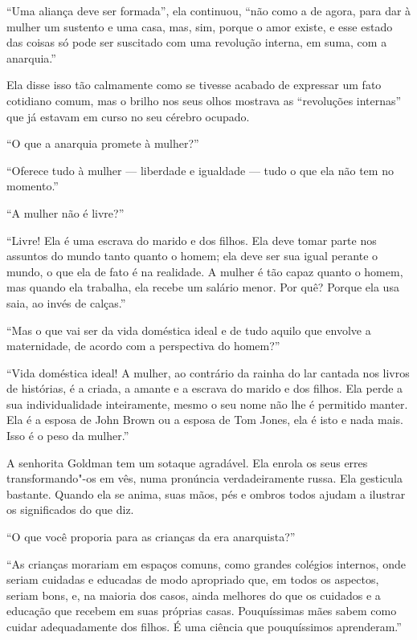 ``Uma aliança deve ser formada'', ela continuou, ``não como a de agora,
para dar à mulher um sustento e uma casa, mas, sim, porque o amor
existe, e esse estado das coisas só pode ser suscitado com uma revolução
interna, em suma, com a anarquia.''\label{alianca}

Ela disse isso tão calmamente como se tivesse acabado de expressar um
fato cotidiano comum, mas o brilho nos seus olhos mostrava as
``revoluções internas'' que já estavam em curso no seu cérebro ocupado.

``O que a anarquia promete à mulher?''

``Oferece tudo à mulher --- liberdade e igualdade --- tudo o que ela não
tem no momento.''

``A mulher não é livre?''

``Livre! Ela é uma escrava do marido e dos filhos. Ela deve tomar parte
nos assuntos do mundo tanto quanto o homem; ela deve ser sua igual
perante o mundo, o que ela de fato é na realidade. A mulher é tão capaz
quanto o homem, mas quando ela trabalha, ela recebe um salário menor.
Por quê? Porque ela usa saia, ao invés de calças.''

``Mas o que vai ser da vida doméstica ideal e de tudo aquilo que envolve
a maternidade, de acordo com a perspectiva do homem?''

``Vida doméstica ideal! A mulher, ao contrário da rainha do lar cantada
nos livros de histórias, é a criada, a amante e a escrava do marido e dos
filhos. Ela perde a sua individualidade inteiramente, mesmo o seu nome
não lhe é permitido manter. Ela é a esposa de John Brown ou a esposa de
Tom Jones, ela é isto e nada mais. Isso é o peso da mulher.'' 

A senhorita Goldman tem um sotaque agradável. Ela enrola os seus erres
transformando"-os em vês, numa pronúncia verdadeiramente russa. Ela
gesticula bastante. Quando ela se anima, suas mãos, pés e ombros todos
ajudam a ilustrar os significados do que diz.

``O que você proporia para as crianças da era anarquista?''

``As crianças morariam em espaços comuns, como grandes colégios
internos, onde seriam cuidadas e educadas de modo apropriado que, em
todos os aspectos, seriam bons, e, na maioria dos casos, ainda
melhores do que os cuidados e a educação que recebem em suas próprias
casas. Pouquíssimas mães sabem como cuidar adequadamente dos filhos. É
uma ciência que pouquíssimos aprenderam.''

